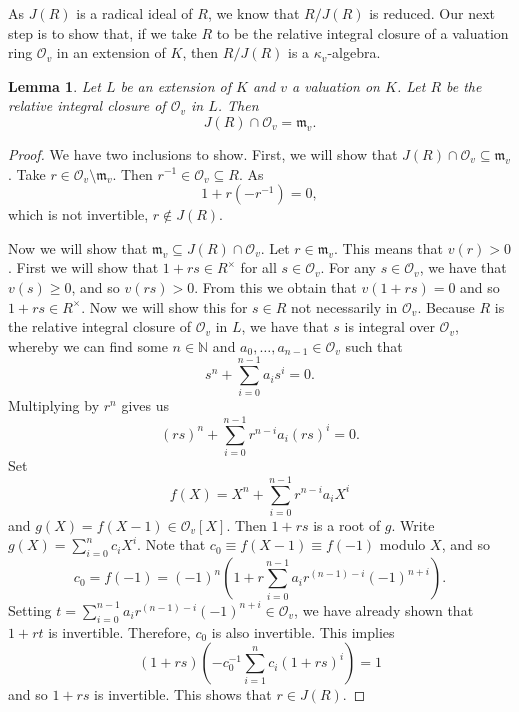 \documentclass[12pt,a4paper]{amsart}
\newtheorem{lem}[thm]{Lemma}
\theoremstyle{definition}
\begin{document}
As $J(R)$ is a radical ideal of $R$, we know that $R/J(R)$ is reduced.
Our next step is to show that, if we take $R$ to be the relative integral closure of a valuation ring $\mathcal{O}_v$ in an extension of $K$,
then $R/J(R)$ is a $\kappa_v$-algebra.
\begin{lem}{\label{int}}
Let $L$ be an extension of $K$ and $v$ a valuation on $K$.
Let $R$ be the relative integral closure of $\mathcal{O}_v$ in $L$.
Then $$J(R)\cap \mathcal{O}_v=\mathfrak{m}_v.$$
\end{lem}
\begin{proof}
We have two inclusions to show.
First, we will show that \hbox{$J(R)\cap \mathcal{O}_v\subseteq \mathfrak{m}_v$.}
Take $r\in \mathcal{O}_v\setminus \mathfrak{m}_v$.
Then $r^{-1}\in \mathcal{O}_v\subseteq R$.
As $$1+r\left(-r^{-1}\right)=0,$$ which is not invertible, $r\notin J(R)$.

Now we will show that $\mathfrak{m}_v\subseteq J(R)\cap \mathcal{O}_v$.
Let $r\in \mathfrak{m}_v$.
This means that $v(r)>0$.
First we will show that $1+rs\in R^{\times}$ for all $s\in \mathcal{O}_v$.
For any $s\in \mathcal{O}_v$, we have that $v(s)\geq0$, and so $v(rs)>0$.
From this we obtain that $v(1+rs)=0$ and so $1+rs\in R^{\times}$.
Now we will show this for $s\in R$ not necessarily in $\mathcal{O}_v$.
Because $R$ is the relative integral closure of $\mathcal{O}_v$ in $L$,
we have that $s$ is integral over $\mathcal{O}_v$, whereby
we can find some $n\in\mathds{N}$ and $a_0,\ldots,a_{n-1}\in \mathcal{O}_v$ such that
$$s^n+\sum_{i=0}^{n-1}a_is^i=0.$$
Multiplying by $r^n$ gives us
$$(rs)^n+\sum_{i=0}^{n-1}r^{n-i}a_i(rs)^i=0.$$
Set $$f(X)=X^n+\sum_{i=0}^{n-1}r^{n-i}a_iX^i$$ and $g(X)=f(X-1)\in \mathcal{O}_v[X]$.
Then $1+rs$ is a root of $g$.
Write $g(X)=\sum_{i=0}^nc_iX^i$.
Note that $c_0\equiv f(X-1)\equiv f(-1)$ modulo $X$, and so
$$c_0=f(-1)=(-1)^n\left(1+r\sum_{i=0}^{n-1}a_ir^{(n-1)-i}(-1)^{n+i}\right).$$
Setting $t=\sum_{i=0}^{n-1}a_ir^{(n-1)-i}(-1)^{n+i}\in \mathcal{O}_v$, we have already shown that $1+rt$ is invertible.
Therefore, $c_0$ is also invertible.
This implies $$(1+rs)\left(-c_0^{-1}\sum_{i=1}^nc_i(1+rs)^i\right)=1$$
and so $1+rs$ is invertible.
This shows that $r\in J(R)$.
\end{proof}
\end{document}
